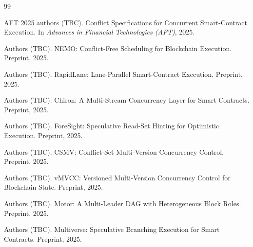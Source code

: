 \begin{thebibliography}{99}

{AFT 2025 authors (TBC)}.
\newblock Conflict Specifications for Concurrent Smart-Contract Execution.
\newblock In \emph{Advances in Financial Technologies (AFT)}, 2025.

{Authors (TBC)}.
\newblock NEMO: Conflict-Free Scheduling for Blockchain Execution.
\newblock Preprint, 2025.

{Authors (TBC)}.
\newblock RapidLane: Lane-Parallel Smart-Contract Execution.
\newblock Preprint, 2025.

{Authors (TBC)}.
\newblock Chiron: A Multi-Stream Concurrency Layer for Smart Contracts.
\newblock Preprint, 2025.

{Authors (TBC)}.
\newblock ForeSight: Speculative Read-Set Hinting for Optimistic
  Execution.
\newblock Preprint, 2025.

{Authors (TBC)}.
\newblock CSMV: Conflict-Set Multi-Version Concurrency Control.
\newblock Preprint, 2025.

{Authors (TBC)}.
\newblock vMVCC: Versioned Multi-Version Concurrency Control for
  Blockchain State.
\newblock Preprint, 2025.

{Authors (TBC)}.
\newblock Motor: A Multi-Leader DAG with Heterogeneous Block Roles.
\newblock Preprint, 2025.

{Authors (TBC)}.
\newblock Multiverse: Speculative Branching Execution for Smart
  Contracts.
\newblock Preprint, 2025.

\end{thebibliography}

\appendix

